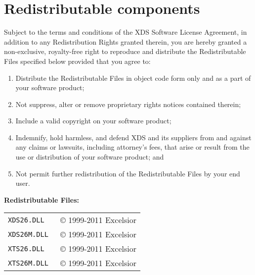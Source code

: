 \chapter{Redistributable components}
\label{redistr}

 Subject to the terms and conditions of the XDS Software License Agreement,
 in addition to any Redistribution Rights granted therein, you are hereby
 granted a non-exclusive, royalty-free right to reproduce and distribute
 the Redistributable Files specified below provided that you agree to:

\begin{enumerate}
\item Distribute the Redistributable Files in object code form only and
      as a part of your software product;
\item Not suppress, alter or remove proprietary rights notices contained therein;
\item Include a valid copyright on your software product;
\item Indemnify, hold harmless, and defend XDS and its suppliers from and against
      any claims or lawsuits, including attorney's fees, that arise or result
      from the use or distribution of your software product; and
\item Not permit further redistribution of the Redistributable Files by your end user.
\end{enumerate}

{\bf Redistributable Files:}

\begin{tabular}{ll}
\tt XDS26.DLL  & \copyright{} 1999-2011 Excelsior \\
\tt XDS26M.DLL & \copyright{} 1999-2011 Excelsior \\
\tt XTS26.DLL  & \copyright{} 1999-2011 Excelsior \\
\tt XTS26M.DLL & \copyright{} 1999-2011 Excelsior
\end{tabular}

